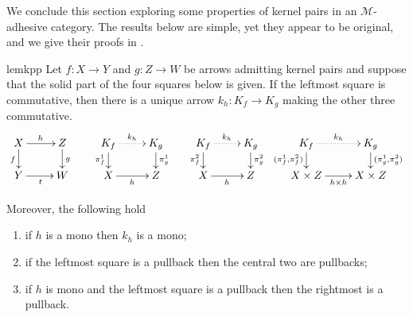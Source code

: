 \documentclass[3p]{elsarticle}
\def\D{\textbf {\textup{D}}}
\def\X{\textbf {\textup{X}}}
\newcommand{\commentato}[1]{ {} }
\theoremstyle{remark}
\theoremstyle{definition}
\begin{document}
\commentato{ 
\begin{restatable}{cor}{natepi}\label{cor:reg_epi_components_reg_epi_nat_trans}
    Let $\X$ be a category with pullbacks and $\phi\colon F \to G$ a natural transformation between functors $F, G: \D \rightrightarrows \X$. If $\phi_d$ is a regular epi for every $d$, then $\phi$ is a regular epi.
\end{restatable}

From the previous result we deduce that the class of regular epis is closed under colimits.

\begin{restatable}{lem}{epicol}\label{lemma:nat_trans_reg_epi_canonical_arrow_reg_epi}
    Let $F,G\colon \D\rightrightarrows \X$ be two diagrams, and suppose that $\X$ has all colimits of shape $\D$. Let $(X, \{x_d\}_{d \in \D})$ and $(Y, \{y_d\}_{d\in D})$ be the colimits of $F$ and $G$, respectively.  If $\phi\colon  F \to G$ is a natural transformation whose components are regular epis, then the arrow induced by $\phi$ from $X$ to $Y$ is a regular epi.
\end{restatable}
}
We conclude this section exploring some properties of kernel pairs in an $\mathcal{M}$-adhesive category. 
The results below are simple, yet they appear to be original, and we give their proofs in .

\begin{restatable}{lem}{kpp}\label{lemma:kern_pairs_pres_pullbacks}
	Let $f\colon X \to Y$ and $g\colon Z \to W$ be arrows admitting kernel pairs and suppose that the solid part of the four squares below is given. 
	If the leftmost square is commutative, then there is a unique arrow $k_h\colon K_f \to K_g$ making the other three commutative.
	\[\xymatrix@R=15pt{X \ar[r]^{h}\ar[d]_{f}& Z \ar[d]^{g} & K_f \ar@{.>}[r]^{k_h} \ar[d]_{\pi^1_f}& K_g \ar[d]^{\pi^1_g} & K_f  \ar@{.>}[r]^{k_h} \ar[d]_{\pi^2_f}& K_g \ar[d]^{\pi^2_g}& K_f  \ar@{.>}[r]^{k_h} \ar[d]_{(\pi^1_f,\pi^2_f)} & K_g \ar[d]^{(\pi^1_g, \pi^2_g)}\\ Y \ar[r]_t& W & X \ar[r]_{h} & Z & X\ar[r]_{h} &Z & X\times Z \ar[r]_{h\times h}& X\times Z}\]
	
		Moreover, the following hold
		\begin{enumerate}
			\item if $h$ is a mono then $k_h$ is a mono;
			\item if the leftmost square is a pullback then the central two are pullbacks;
			\item if $h$ is mono and the leftmost square is a pullback then the rightmost is a pullback.
		\end{enumerate} 
\end{restatable}
\end{document}
